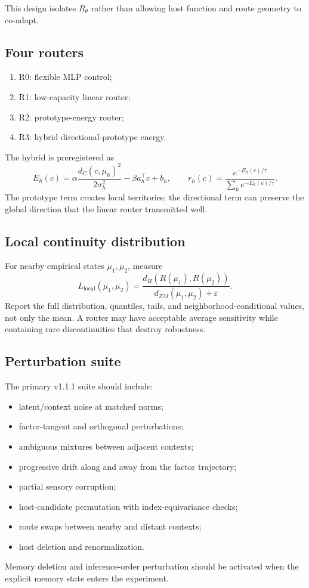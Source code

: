 \documentclass[11pt,a4paper]{article}
\begin{document}
This design isolates $R_\theta$ rather than allowing host function and route geometry to co-adapt.

\subsection{Four routers}
\begin{enumerate}
\item R0: flexible MLP control;
\item R1: low-capacity linear router;
\item R2: prototype-energy router;
\item R3: hybrid directional-prototype energy.
\end{enumerate}
The hybrid is preregistered as
\begin{equation}
E_h(c)=\alpha\frac{d_C(c,\mu_h)^2}{2\sigma_h^2}-\beta a_h^\top c+b_h,
\qquad
r_h(c)=\frac{e^{-E_h(c)/\tau}}{\sum_k e^{-E_k(c)/\tau}}.
\end{equation}
The prototype term creates local territories; the directional term can preserve the global direction that the linear router transmitted well.

\subsection{Local continuity distribution}
For nearby empirical states $\mu_1,\mu_2$, measure
\begin{equation}
L_{\mathrm{local}}(\mu_1,\mu_2)=
\frac{d_H(R(\mu_1),R(\mu_2))}{d_{ZM}(\mu_1,\mu_2)+\varepsilon}.
\end{equation}
Report the full distribution, quantiles, tails, and neighborhood-conditional values, not only the mean. A router may have acceptable average sensitivity while containing rare discontinuities that destroy robustness.

\subsection{Perturbation suite}
The primary v1.1.1 suite should include:
\begin{itemize}
\item latent/context noise at matched norms;
\item factor-tangent and orthogonal perturbations;
\item ambiguous mixtures between adjacent contexts;
\item progressive drift along and away from the factor trajectory;
\item partial sensory corruption;
\item host-candidate permutation with index-equivariance checks;
\item route swaps between nearby and distant contexts;
\item host deletion and renormalization.
\end{itemize}
Memory deletion and inference-order perturbation should be activated when the explicit memory state enters the experiment.
\end{document}
